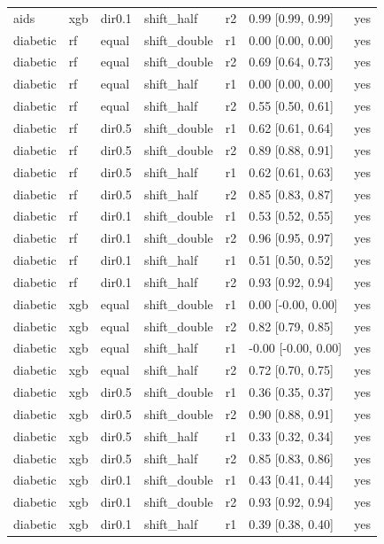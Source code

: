 \begin{tabular}{lllllll}
aids & xgb & dir0.1 & shift\_half & r2 & 0.99 [0.99, 0.99] & yes \\
\addlinespace
diabetic & rf & equal & shift\_double & r1 & 0.00 [0.00, 0.00] & yes \\
diabetic & rf & equal & shift\_double & r2 & 0.69 [0.64, 0.73] & yes \\
diabetic & rf & equal & shift\_half & r1 & 0.00 [0.00, 0.00] & yes \\
diabetic & rf & equal & shift\_half & r2 & 0.55 [0.50, 0.61] & yes \\
diabetic & rf & dir0.5 & shift\_double & r1 & 0.62 [0.61, 0.64] & yes \\
diabetic & rf & dir0.5 & shift\_double & r2 & 0.89 [0.88, 0.91] & yes \\
diabetic & rf & dir0.5 & shift\_half & r1 & 0.62 [0.61, 0.63] & yes \\
diabetic & rf & dir0.5 & shift\_half & r2 & 0.85 [0.83, 0.87] & yes \\
diabetic & rf & dir0.1 & shift\_double & r1 & 0.53 [0.52, 0.55] & yes \\
diabetic & rf & dir0.1 & shift\_double & r2 & 0.96 [0.95, 0.97] & yes \\
diabetic & rf & dir0.1 & shift\_half & r1 & 0.51 [0.50, 0.52] & yes \\
diabetic & rf & dir0.1 & shift\_half & r2 & 0.93 [0.92, 0.94] & yes \\
diabetic & xgb & equal & shift\_double & r1 & 0.00 [-0.00, 0.00] & yes \\
diabetic & xgb & equal & shift\_double & r2 & 0.82 [0.79, 0.85] & yes \\
diabetic & xgb & equal & shift\_half & r1 & -0.00 [-0.00, 0.00] & yes \\
diabetic & xgb & equal & shift\_half & r2 & 0.72 [0.70, 0.75] & yes \\
diabetic & xgb & dir0.5 & shift\_double & r1 & 0.36 [0.35, 0.37] & yes \\
diabetic & xgb & dir0.5 & shift\_double & r2 & 0.90 [0.88, 0.91] & yes \\
diabetic & xgb & dir0.5 & shift\_half & r1 & 0.33 [0.32, 0.34] & yes \\
diabetic & xgb & dir0.5 & shift\_half & r2 & 0.85 [0.83, 0.86] & yes \\
diabetic & xgb & dir0.1 & shift\_double & r1 & 0.43 [0.41, 0.44] & yes \\
diabetic & xgb & dir0.1 & shift\_double & r2 & 0.93 [0.92, 0.94] & yes \\
diabetic & xgb & dir0.1 & shift\_half & r1 & 0.39 [0.38, 0.40] & yes \\

\end{tabular}
